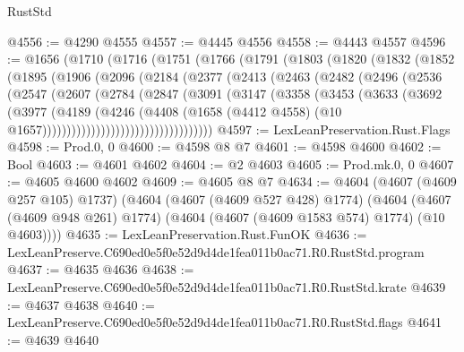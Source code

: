 \begin{lexlean}{RustStd}
\begin{coremodule}
@4556 := @4290 @4555
@4557 := @4445 @4556
@4558 := @4443 @4557
@4596 := @1656
    (@1710
      (@1716
        (@1751
          (@1766
            (@1791
              (@1803
                (@1820
                  (@1832
                    (@1852
                      (@1895
                        (@1906
                          (@2096
                            (@2184
                              (@2377
                                (@2413
                                  (@2463
                                    (@2482
                                      (@2496
                                        (@2536
                                          (@2547
                                            (@2607
                                              (@2784
                                                (@2847
                                                  (@3091
                                                    (@3147
                                                      (@3358
                                                        (@3453
                                                          (@3633
                                                            (@3692
                                                              (@3977
                                                                (@4189
                                                                  (@4246
                                                                    (@4408
                                                                      (@1658
                                                                        (@4412 @4558)
                                                                        (@10
                                                                          @1657)))))))))))))))))))))))))))))))))))
@4597 := LexLeanPreservation.Rust.Flags
@4598 := Prod.{0, 0}
@4600 := @4598 @8 @7
@4601 := @4598 @4600
@4602 := Bool
@4603 := @4601 @4602
@4604 := @2 @4603
@4605 := Prod.mk.{0, 0}
@4607 := @4605 @4600 @4602
@4609 := @4605 @8 @7
@4634 := @4604
    (@4607 (@4609 @257 @105) @1737)
    (@4604
      (@4607 (@4609 @527 @428) @1774)
      (@4604 (@4607 (@4609 @948 @261) @1774) (@4604 (@4607 (@4609 @1583 @574) @1774) (@10 @4603))))
@4635 := LexLeanPreservation.Rust.FunOK
@4636 := LexLeanPreserve.C690ed0e5f0e52d9d4de1fea011b0ac71.R0.RustStd.program
@4637 := @4635 @4636
@4638 := LexLeanPreserve.C690ed0e5f0e52d9d4de1fea011b0ac71.R0.RustStd.krate
@4639 := @4637 @4638
@4640 := LexLeanPreserve.C690ed0e5f0e52d9d4de1fea011b0ac71.R0.RustStd.flags
@4641 := @4639 @4640

\end{coremodule}
\end{lexlean}
